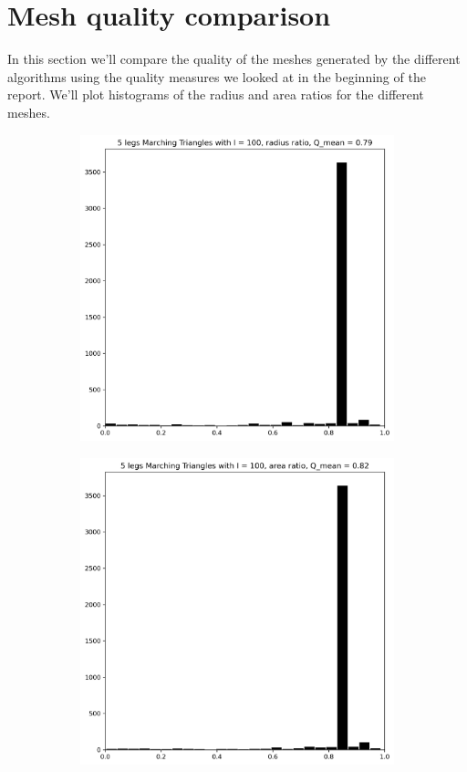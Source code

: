 \documentclass[acmtog]{acmart}
\begin{document}
\newpage
\section{Mesh quality comparison}
In this section we'll compare the quality of the meshes generated by the
different algorithms using the quality measures we looked at in the beginning
of the report. We'll plot histograms of the radius and area ratios for the
different meshes.
\begin{figure}[H]
  \centering
  \begin{subfigure}{0.22\textwidth}
    \centering
    \includegraphics[width=\textwidth]{Images/histograms/5 legs Marching Triangles with I = 100, radius ratio.png}
  \end{subfigure}\hfill
  \begin{subfigure}{0.22\textwidth}
    \centering
    \includegraphics[width=\textwidth]{Images/histograms/5 legs Marching Triangles with I = 100, area ratio.png}

\end{subfigure}
\end{figure}
\end{document}

